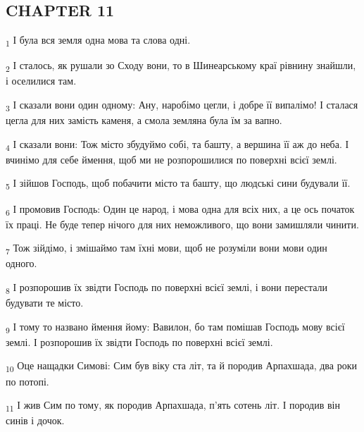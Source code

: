 \subsection{CHAPTER 11}
\begin{tcolorbox}
\textsubscript{1} І була вся земля одна мова та слова одні.
\end{tcolorbox}
\begin{tcolorbox}
\textsubscript{2} І сталось, як рушали зо Сходу вони, то в Шинеарському краї рівнину знайшли, і оселилися там.
\end{tcolorbox}
\begin{tcolorbox}
\textsubscript{3} І сказали вони один одному: Ану, наробімо цегли, і добре її випалімо! І сталася цегла для них замість каменя, а смола земляна була їм за вапно.
\end{tcolorbox}
\begin{tcolorbox}
\textsubscript{4} І сказали вони: Тож місто збудуймо собі, та башту, а вершина її аж до неба. І вчинімо для себе ймення, щоб ми не розпорошилися по поверхні всієї землі.
\end{tcolorbox}
\begin{tcolorbox}
\textsubscript{5} І зійшов Господь, щоб побачити місто та башту, що людські сини будували її.
\end{tcolorbox}
\begin{tcolorbox}
\textsubscript{6} І промовив Господь: Один це народ, і мова одна для всіх них, а це ось початок їх праці. Не буде тепер нічого для них неможливого, що вони замишляли чинити.
\end{tcolorbox}
\begin{tcolorbox}
\textsubscript{7} Тож зійдімо, і змішаймо там їхні мови, щоб не розуміли вони мови один одного.
\end{tcolorbox}
\begin{tcolorbox}
\textsubscript{8} І розпорошив їх звідти Господь по поверхні всієї землі, і вони перестали будувати те місто.
\end{tcolorbox}
\begin{tcolorbox}
\textsubscript{9} І тому то названо ймення йому: Вавилон, бо там помішав Господь мову всієї землі. І розпорошив їх звідти Господь по поверхні всієї землі.
\end{tcolorbox}
\begin{tcolorbox}
\textsubscript{10} Оце нащадки Симові: Сим був віку ста літ, та й породив Арпахшада, два роки по потопі.
\end{tcolorbox}
\begin{tcolorbox}
\textsubscript{11} І жив Сим по тому, як породив Арпахшада, п'ять сотень літ. І породив він синів і дочок.
\end{tcolorbox}
